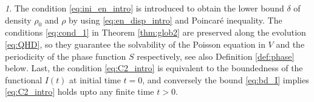 \documentclass[leqno]{amsart}
\theoremstyle{plain}
\theoremstyle{definition}
\theoremstyle{remark}
\newtheorem{rem}[thm]{\protect\remarkname}
\theoremstyle{plain}
\theoremstyle{plain}
\providecommand{\remarkname}{Remark}
\def\T{{\mathbb T}}%
\numberwithin{equation}{section}
\begin{document}
\begin{rem}
The condition \eqref{eq:ini_en_intro} is introduced to obtain the lower bound $\delta$ of density $\rho_0$ and $\rho$ by using  \eqref{eq:en_disp_intro} and Poincar\'e inequality.
The conditions \eqref{eq:cond_1} in Theorem \ref{thm:glob2} are preserved along the evolution \eqref{eq:QHD}, so they guarantee the solvability of the Poisson equation in $V$ and the periodicity of the phase function $S$ respectively, see also Definition \ref{def:phase} below. Last, the condition \eqref{eq:C2_intro} is equivalent to the boundedness of the functional $I(t)$ at initial time $t=0$, and conversely the bound \eqref{eq:bd_I} implies \eqref{eq:C2_intro} holds upto any finite time $t>0$.

\end{rem}
\end{document}
